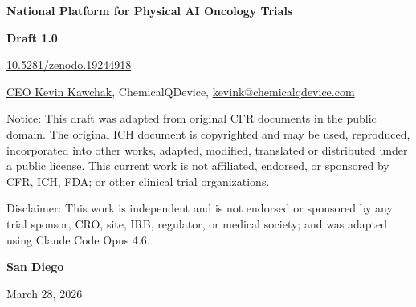 \thispagestyle{coverpage}
\setlength{\headheight}{32pt}

\vspace*{4cm}

\begin{center}
    {\fontsize{19}{23}\selectfont\bfseries National Platform for Physical AI Oncology Trials}\\

    \vspace{0.5cm}

    {\bf Draft 1.0}\\

    \vspace{2.0cm}

    \href{https://doi.org/10.5281/zenodo.19244918}{10.5281/zenodo.19244918}\\

    \vspace{0.5cm}

    \href{https://orcid.org/0009-0007-5457-8667}{CEO Kevin Kawchak},
    ChemicalQDevice,
    \href{mailto:kevink@chemicalqdevice.com}{kevink@chemicalqdevice.com}\\

    \vspace{0.5cm}

    Notice: This draft was adapted from original CFR documents in the public
    domain. The original ICH document is copyrighted and may be used,
    reproduced, incorporated into other works, adapted, modified, translated
    or distributed under a public license. This current work is not affiliated,  endorsed, or sponsored by CFR, ICH, FDA; or other clinical trial organizations.\\

    \vspace{0.5cm}

    Disclaimer: This work is independent and is not endorsed or sponsored by any trial sponsor,
    CRO, site, IRB, regulator, or medical society; and was adapted using Claude Code Opus 4.6.\\

    \vspace{0.5cm}


    \vspace{4cm}

    {\bf San Diego}\\

    \vspace{4cm}

    March 28, 2026

\end{center}

\newpage
\setlength{\headheight}{32pt}

